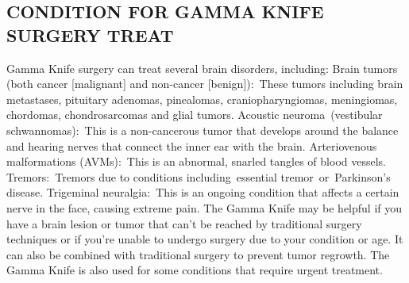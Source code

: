 \documentclass[12pt]{article}
\begin{document}
 \subsection{CONDITION FOR GAMMA KNIFE SURGERY TREAT}
Gamma Knife surgery can treat several brain disorders, including:
Brain tumors (both cancer [malignant] and non-cancer [benign]): These tumors including brain metastases, pituitary adenomas, pinealomas, craniopharyngiomas, meningiomas, chordomas, chondrosarcomas and glial tumors.
Acoustic neuroma (vestibular schwannomas): This is a non-cancerous tumor that develops around the balance and hearing nerves that connect the inner ear with the brain.
Arteriovenous malformations (AVMs): This is an abnormal, snarled tangles of blood vessels.
Tremors: Tremors due to conditions including essential tremor or Parkinson’s disease.
Trigeminal neuralgia: This is an ongoing condition that affects a certain nerve in the face, causing extreme pain.
The Gamma Knife may be helpful if you have a brain lesion or tumor that can’t be reached by traditional surgery techniques or if you’re unable to undergo surgery due to your condition or age. It can also be combined with traditional surgery to prevent tumor regrowth. The Gamma Knife is also used for some conditions that require urgent treatment.

 
\end{document}
